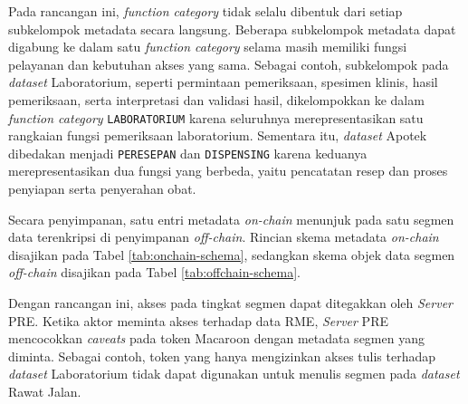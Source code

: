 Pada rancangan ini, \textit{function category} tidak selalu dibentuk dari setiap subkelompok metadata secara langsung. Beberapa subkelompok metadata dapat digabung ke dalam satu \textit{function category} selama masih memiliki fungsi pelayanan dan kebutuhan akses yang sama. Sebagai contoh, subkelompok pada \textit{dataset} Laboratorium, seperti permintaan pemeriksaan, spesimen klinis, hasil pemeriksaan, serta interpretasi dan validasi hasil, dikelompokkan ke dalam \textit{function category} \texttt{LABORATORIUM} karena seluruhnya merepresentasikan satu rangkaian fungsi pemeriksaan laboratorium. Sementara itu, \textit{dataset} Apotek dibedakan menjadi \texttt{PERESEPAN} dan \texttt{DISPENSING} karena keduanya merepresentasikan dua fungsi yang berbeda, yaitu pencatatan resep dan proses penyiapan serta penyerahan obat.

Secara penyimpanan, satu entri metadata \textit{on-chain} menunjuk pada satu segmen data terenkripsi di penyimpanan \textit{off-chain}. Rincian skema metadata \textit{on-chain} disajikan pada Tabel \ref{tab:onchain-schema}, sedangkan skema objek data segmen \textit{off-chain} disajikan pada Tabel \ref{tab:offchain-schema}.

Dengan rancangan ini, akses pada tingkat segmen dapat ditegakkan oleh \textit{Server} PRE. Ketika aktor meminta akses terhadap data RME, \textit{Server} PRE mencocokkan \textit{caveats} pada token Macaroon dengan metadata segmen yang diminta. Sebagai contoh, token yang hanya mengizinkan akses tulis terhadap \textit{dataset} Laboratorium tidak dapat digunakan untuk menulis segmen pada \textit{dataset} Rawat Jalan.
